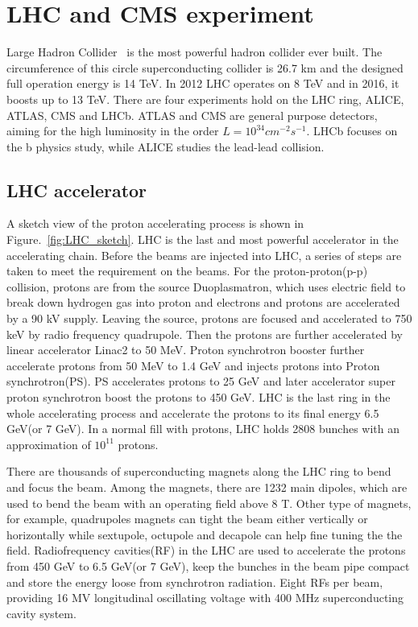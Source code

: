 \chapter{LHC and CMS experiment}

Large Hadron Collider~\cite{LHC_refer} is the most powerful hadron collider ever built. The circumference of this circle superconducting collider is 26.7 km and the designed full operation energy is 14 TeV. In 2012 LHC operates on 8 TeV and in 2016, it boosts up to 13 TeV. There are four experiments hold on the LHC ring, ALICE, ATLAS, CMS and LHCb. ATLAS and CMS are general purpose detectors, aiming for the high luminosity in the order $L=10^{34} cm^{-2}s^{-1}$. LHCb focuses on the b physics study, while ALICE studies the lead-lead collision.

\section{LHC accelerator}

A sketch view of the proton accelerating process is shown in Figure.~\ref{fig:LHC_sketch}. LHC is the last and most powerful accelerator in the accelerating chain. Before the beams are injected into LHC, a series of steps are taken to meet the requirement on the beams. For the proton-proton(p-p) collision, protons are from the source Duoplasmatron, which uses electric field to break down hydrogen gas into proton and electrons and protons are accelerated by a 90 kV supply. Leaving the source, protons are focused and accelerated to 750 keV by radio frequency quadrupole. Then the protons are further accelerated by linear accelerator Linac2 to 50 MeV. Proton synchrotron booster further accelerate protons from 50 MeV to 1.4 GeV and injects protons into Proton synchrotron(PS). PS accelerates protons to 25 GeV and later accelerator super proton synchrotron boost the protons to 450 GeV. LHC is the last ring in the whole accelerating process and accelerate the protons to its final energy 6.5 GeV(or 7 GeV). In a normal fill with protons, LHC holds 2808 bunches with an approximation of $10^{11}$ protons.

There are thousands of superconducting magnets along the LHC ring to bend and focus the beam. Among the magnets, there are 1232 main dipoles, which are used to bend the beam with an operating field above 8 T. Other type of magnets, for example, quadrupoles magnets can tight the beam either vertically or horizontally while  sextupole, octupole and decapole can help fine tuning the the field. Radiofrequency cavities(RF) in the LHC are used to accelerate the protons from 450 GeV to 6.5 GeV(or 7 GeV), keep the bunches in the beam pipe compact and store the energy loose from synchrotron radiation. Eight RFs per beam, providing 16 MV  longitudinal oscillating voltage with 400 MHz superconducting cavity system. 

